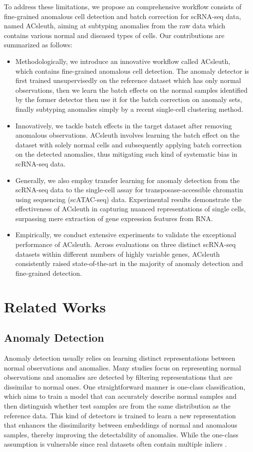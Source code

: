 \documentclass{article}
\begin{document}
To address these limitations, we propose an comprehensive workflow consists of fine-grained anomalous cell 
detection and batch correction for scRNA-seq data, named ACsleuth, aiming at 
subtyping anomalies from the raw data which contains various normal and diseased types of 
cells. Our contributions are summarized as follows:
\begin{itemize}

\item Methodologically, we introduce an innovative workflow called ACsleuth, which contains 
fine-grained anomalous cell detection. The anomaly detector is first trained 
unsupervisedly on the reference dataset which has only normal observations, then we learn 
the batch effects on the normal samples identified by the former detector then use it for 
the batch correction on anomaly sets, finally subtyping anomalies simply by a recent 
single-cell clustering method.
\item Innovatively, we tackle batch effects in the target dataset after removing anomalous 
observations. ACsleuth involves learning the batch effect on the dataset with solely normal 
cells and subsequently applying batch correction on the detected anomalies, thus 
mitigating such kind of systematic bias in scRNA-seq data. 
\item Generally, we also employ transfer learning for anomaly detection from the scRNA-seq 
data to the single-cell assay for transposase-accessible chromatin using 
sequencing (scATAC-seq) data. Experimental results demonstrate the effectiveness of ACsleuth 
in capturing nuanced representations of single cells, surpassing mere extraction of gene 
expression features from RNA.
\item Empirically, we conduct extensive experiments to validate the exceptional performance 
of ACsleuth. Across evaluations on three distinct scRNA-seq datasets within different numbers 
of highly variable genes, ACsleuth consistently raised state-of-the-art in the majority of 
anomaly detection and fine-grained detection.
\end{itemize}
\section{Related Works}
\subsection{Anomaly Detection}
Anomaly detection usually relies on learning distinct representations between normal 
observations and anomalies. Many studies focus on representing normal observations and 
anomalies are detected by filtering representations that are dissimilar to normal ones. 
One straightforward manner is one-class classification, which aims to train a model that 
can accurately describe normal samples and then distinguish whether test samples are from 
the same distribution as the reference data. This kind of detectors is trained to learn a 
new representation \cite{RCA} \cite {liznerski} that 
enhances the dissimilarity between embeddings of normal and anomalous samples, thereby 
improving the detectability of anomalies. While the one-class assumption is vulnerable 
since real datasets often contain multiple inliers \cite{SLAD}.
\end{document}

